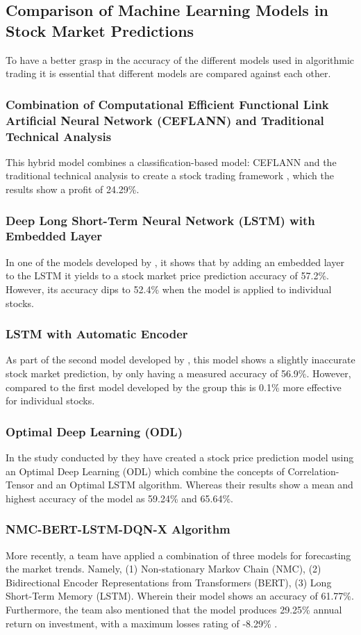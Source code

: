 \subsection{Comparison of Machine Learning Models in Stock Market Predictions}
\label{subsec:comparison_ml}
To have a better grasp in the accuracy of the different models 
used in algorithmic trading it is essential that different models are 
compared against each other.

\subsubsection{Combination of Computational Efficient Functional Link Artificial Neural Network (CEFLANN) and Traditional Technical Analysis}
\label{subsubsec:ceflann}
This hybrid model combines a classification-based model: CEFLANN and 
the traditional technical analysis to create a stock trading framework 
, which the results show a profit of 24.29\%.
\subsubsection{Deep Long Short-Term Neural Network (LSTM) with Embedded Layer}
\label{subsubsec:lstm}
In one of the models developed by , 
it shows that by adding an embedded layer to the LSTM it yields to a 
stock market price prediction accuracy of 57.2\%. 
However, its accuracy dips to 52.4\% when the model is applied to individual stocks.
\subsubsection{LSTM with Automatic Encoder}
\label{subsubsec:lstm_autoencoder}
As part of the second model developed by , this model 
shows a slightly inaccurate stock market prediction, by only having 
a measured accuracy of 56.9\%. 
However, compared to the first model developed by the group this is 0.1\%
more effective for individual stocks.
\subsubsection{Optimal Deep Learning (ODL)}
\label{subsubsec:odl}
In the study conducted by  they have created a 
stock price prediction model using an Optimal Deep Learning (ODL) 
which combine the concepts of Correlation-Tensor and an Optimal LSTM algorithm. 
Whereas their results show a mean and highest accuracy of the model as 59.24\% 
and 65.64\%.
\subsubsection{NMC-BERT-LSTM-DQN-X Algorithm}
\label{subsubsec:nmc_bert_lstm_dqn_x}
More recently, a team have applied a combination of three models for 
forecasting the market trends. Namely, (1) Non-stationary Markov Chain (NMC), 
(2) Bidirectional Encoder Representations from Transformers (BERT), 
(3) Long Short-Term Memory (LSTM). Wherein their model shows an accuracy of 61.77\%. 
Furthermore, the team also mentioned that the model produces 29.25\% 
annual return on investment, with a maximum losses rating of -8.29\% 
\cite{Liu2022}.